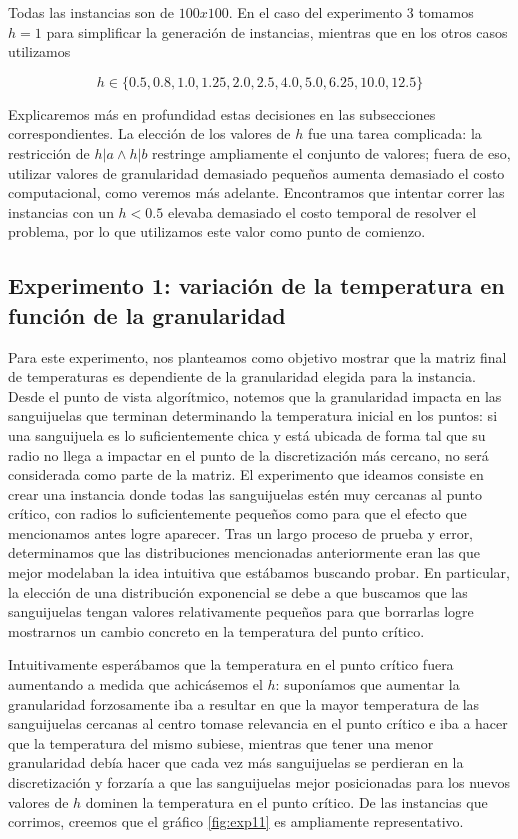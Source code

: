 Todas las instancias son de $100x100$. En el caso del experimento 3 tomamos $h = 1$ para simplificar la generación de instancias, mientras que en los otros casos utilizamos

$$h \in \{0.5, 0.8, 1.0, 1.25, 2.0, 2.5, 4.0, 5.0, 6.25, 10.0, 12.5\}$$

Explicaremos más en profundidad estas decisiones en las subsecciones correspondientes. La elección de los valores de $h$ fue una tarea complicada: la restricción de $h | a \wedge h | b$ restringe ampliamente el conjunto de valores; fuera de eso, utilizar valores de granularidad demasiado pequeños aumenta demasiado el costo computacional, como veremos más adelante. Encontramos que intentar correr las instancias con un $h < 0.5$ elevaba demasiado el costo temporal de resolver el problema, por lo que utilizamos este valor como punto de comienzo.

\subsection{Experimento 1: variación de la temperatura en función de la granularidad}
Para este experimento, nos planteamos como objetivo mostrar que la matriz final de temperaturas es dependiente de la granularidad elegida para la instancia. Desde el punto de vista algorítmico, notemos que la granularidad impacta en las sanguijuelas que terminan determinando la temperatura inicial en los puntos: si una sanguijuela es lo suficientemente chica y está ubicada de forma tal que su radio no llega a impactar en el punto de la discretización más cercano, no será considerada como parte de la matriz. El experimento que ideamos consiste en crear una instancia donde todas las sanguijuelas estén muy cercanas al punto crítico, con radios lo suficientemente pequeños como para que el efecto que mencionamos antes logre aparecer. Tras un largo proceso de prueba y error, determinamos que las distribuciones mencionadas anteriormente eran las que mejor modelaban la idea intuitiva que estábamos buscando probar. En particular, la elección de una distribución exponencial se debe a que buscamos que las sanguijuelas tengan valores relativamente pequeños para que borrarlas logre mostrarnos un cambio concreto en la temperatura del punto crítico.

Intuitivamente esperábamos que la temperatura en el punto crítico fuera aumentando a medida que achicásemos el $h$: suponíamos que aumentar la granularidad forzosamente iba a resultar en que la mayor temperatura de las sanguijuelas cercanas al centro tomase relevancia en el punto crítico e iba a hacer que la temperatura del mismo subiese, mientras que tener una menor granularidad debía hacer que cada vez más sanguijuelas se perdieran en la discretización y forzaría a que las sanguijuelas mejor posicionadas para los nuevos valores de $h$ dominen la temperatura en el punto crítico. De las instancias que corrimos, creemos que el gráfico \ref{fig:exp11} es ampliamente representativo.

